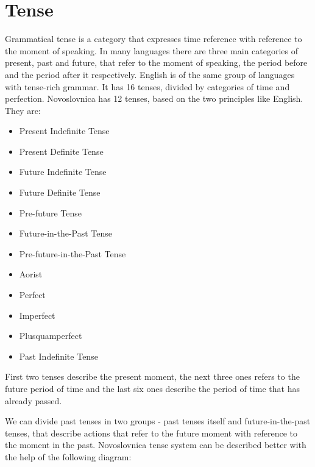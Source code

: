 \section{Tense}

Grammatical tense is a category that expresses time reference with reference to the moment of speaking. In many languages there are three main categories of present, past and future, that refer to the moment of speaking, the period before and the period after it respectively. English is of the same group of languages with tense-rich grammar. It has 16 tenses, divided by categories of time and perfection. Novoslovnica has 12 tenses, based on the two principles like English. They are:

\begin{itemize}
	\item Present Indefinite Tense
	\item Present Definite Tense
	\item Future Indefinite Tense
	\item Future Definite Tense
	\item Pre-future Tense
	\item Future-in-the-Past Tense
	\item Pre-future-in-the-Past Tense
	\item Aorist
	\item Perfect
	\item Imperfect
	\item Plusquamperfect
	\item Past Indefinite Tense
\end{itemize}

First two tenses describe the present moment, the next three ones refers to the future period of time and the last six ones describe the period of time that has already passed.

We can divide past tenses in two groups - past tenses itself and future-in-the-past tenses, that describe actions that refer to the future moment with reference to the moment in the past.
Novoslovnica tense system can be described better with the help of the following diagram:

